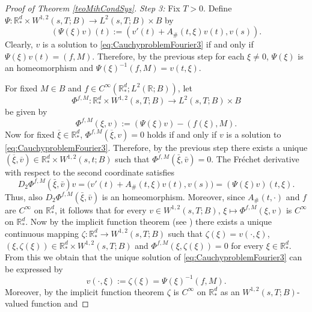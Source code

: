 \documentclass{amsart}
\theoremstyle{plain}
\theoremstyle{remark}
\theoremstyle{plain}
\numberwithin{equation}{section}
\begin{document}
\begin{proof}[Proof of Theorem \ref{teoMihCondSys}]
\medskip

{\em Step 3:} Fix $T>0$. Define $\Psi:{ \mathbb{R} }^{d}_*\times W^{1,2}(s,T;B)\rightarrow L^{2}(s,T;B)\times B$ by
\begin{equation}
(\Psi(\xi)v)(t):=(v'(t) + A_{\#}(t,\xi) v(t),v(s)).
\nonumber
\end{equation}
Clearly, $v$ is a solution to \eqref{eq:CauchyproblemFourier3} if and only if  $\Psi(\xi)v(t)=(f,M)$.
Therefore, by the previous step for each $\xi\neq 0$, $\Psi(\xi)$ is an homeomorphism and $\Psi(\xi)^{-1}(f,M) = v(t,\xi)$.

For fixed $M\in B$ and $f\in C^\infty({ \mathbb{R} }^d_*;L^2({ \mathbb{R} };B))$, let
\[\Phi^{f,M}:{ \mathbb{R} }^{d}_*\times W^{1,2}(s,T;B)\rightarrow L^{2}(s,T;B)\times B\]
be given by
\begin{equation}
\Phi^{f,M}(\xi,v):=(\Psi(\xi)v)-(f(\xi),M).
\nonumber
\end{equation}
Now for fixed $\overline{\xi}\in { \mathbb{R} }^d_*$, $\Phi^{f,M}(\overline{\xi},v)=0$ holds if and only if $v$ is a solution to \eqref{eq:CauchyproblemFourier3}. Therefore, by the previous step there exists a unique $(\overline{\xi},\overline{v})\in{ \mathbb{R} }^d_*\times W^{1,2}(s,t;B)$ such that $\Phi^{f,M}(\bar{\xi},\bar{v})=0$. The Fr\'echet derivative with respect to the second coordinate satisfies
\begin{equation}\label{eq:D2Phi}
D_2 \Phi^{f,M}(\bar{\xi},\bar{v}) v =\big(v'(t) + A_{\#}(t,\xi) v(t),v(s)\big) =  (\Psi(\xi) v) (t,\xi).
\end{equation}
Thus, also $D_2 \Phi^{f,M}(\bar{\xi},\bar{v})$ is an homeomorphism. Moreover, since $A_{\#}(t,\cdot)$ and $f$ are $C^\infty$ on ${ \mathbb{R} }^d_*$, it follows that for every $v\in W^{1,2}(s,T;B)$,  $\xi\mapsto \Phi^{f,M}(\xi, v)$ is $C^\infty$ on ${ \mathbb{R} }^d_*$.
Now by the implicit function theorem (see \cite[Theorem 10.2.1]{Dieu69}) there exists a unique continuous mapping $\zeta:{ \mathbb{R} }^d_*\to W^{1,2}(s,T;B)$ such that $\zeta(\xi)=v(\cdot,\xi)$, $(\xi,\zeta(\xi))\in{ \mathbb{R} }^{d}_*\times W^{1,2}(s,T;B)$ and $\Phi^{f,M}(\xi, \zeta(\xi)) = 0$ for every $\xi\in { \mathbb{R} }^{d}_*$. From this we obtain that the unique solution of \eqref{eq:CauchyproblemFourier3} can be expressed by
\begin{equation}
v(\cdot,\xi):=\zeta(\xi)=\Psi(\xi)^{-1}(f,M).
\nonumber
\end{equation}
Moreover, by the implicit function theorem $\zeta$ is $C^\infty$ on ${ \mathbb{R} }^d_*$ as an $W^{1,2}(s,T;B)$-valued function and

\end{proof}
\end{document}
